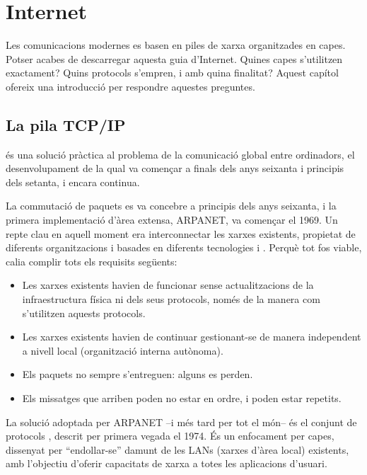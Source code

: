 
\chapter{Internet}\label{sec:internet}

Les comunicacions modernes es basen en piles de xarxa organitzades en capes. 
Potser acabes de descarregar aquesta guia d'Internet.
% 
Quines capes s'utilitzen exactament? Quins protocols s'empren, i amb quina finalitat?
% 
Aquest capítol ofereix una introducció per respondre aquestes preguntes.\\[-1cm]

\section{La pila TCP/IP}\label{sec:internet:the_tcp_ip_stack}


 és una solució pràctica al problema de la comunicació global entre ordinadors,
el desenvolupament de la qual va començar a finals dels anys seixanta i principis dels setanta, i encara continua.

La commutació de paquets es va concebre a principis dels anys seixanta, i la primera 
implementació d'àrea extensa, ARPANET, va començar el 1969. 
% 
Un repte clau en aquell moment era interconnectar les xarxes existents, 
propietat de diferents organitzacions i basades en diferents tecnologies i .
% 
Perquè tot fos viable, calia complir tots els requisits següents:
\begin{itemize}
    \item Les xarxes existents havien de funcionar sense actualitzacions de la infraestructura física 
      ni dels seus protocols, només de la manera com s'utilitzen aquests protocols.
    \item Les xarxes existents havien de continuar gestionant-se de manera independent a nivell local (organització interna autònoma).
    \item Els paquets no sempre s'entreguen: alguns es perden.
    \item Els missatges que arriben poden no estar en ordre, i poden estar repetits.
\end{itemize}

La solució adoptada per ARPANET --i més tard per tot el món-- 
és el conjunt de protocols , descrit per primera vegada el 1974. 
És un enfocament per capes, dissenyat per ``endollar-se'' damunt de 
les LANs (xarxes d'àrea local) existents, amb l'objectiu d'oferir capacitats 
de xarxa a totes les aplicacions d'usuari.

